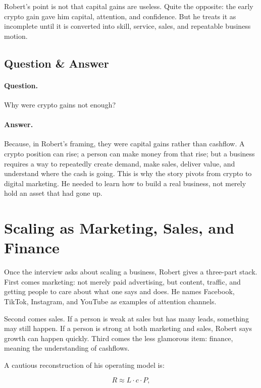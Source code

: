 Robert's point is not that capital gains are useless. Quite the opposite: the early crypto gain gave him capital, attention, and confidence. But he treats it as incomplete until it is converted into skill, service, sales, and repeatable business motion.

\subsection{Question \& Answer}

\paragraph{Question.} Why were crypto gains not enough?

\paragraph{Answer.} Because, in Robert's framing, they were capital gains rather than cashflow. A crypto position can rise; a person can make money from that rise; but a business requires a way to repeatedly create demand, make sales, deliver value, and understand where the cash is going. This is why the story pivots from crypto to digital marketing. He needed to learn how to build a real business, not merely hold an asset that had gone up.

\section{Scaling as Marketing, Sales, and Finance}

Once the interview asks about scaling a business, Robert gives a three-part stack. First comes marketing: not merely paid advertising, but content, traffic, and getting people to care about what one says and does. He names Facebook, TikTok, Instagram, and YouTube as examples of attention channels.

Second comes sales. If a person is weak at sales but has many leads, something may still happen. If a person is strong at both marketing and sales, Robert says growth can happen quickly. Third comes the less glamorous item: finance, meaning the understanding of cashflows.

A cautious reconstruction of his operating model is:

\begin{equation}
R \approx L \cdot c \cdot P,
\end{equation}

